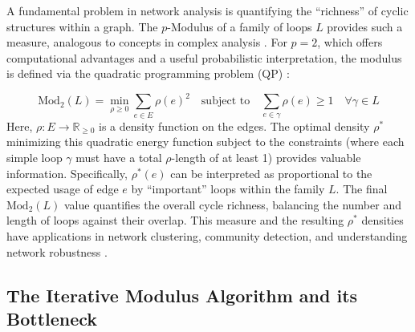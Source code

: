 \documentclass{article}
\begin{document}
\label{sec:loop_modulus_app}
A fundamental problem in network analysis is quantifying the ``richness'' of cyclic structures within a graph. The $p$-Modulus of a family of loops $L$ provides such a measure, analogous to concepts in complex analysis \cite{albin2016minimal}. For $p=2$, which offers computational advantages and a useful probabilistic interpretation, the modulus is defined via the quadratic programming problem (QP) \cite{shakeri2017network}:

\begin{equation}
\label{eq:modulus_primal}
\text{Mod}_2(L) = \min_{\rho \ge 0} \sum_{e \in E} \rho(e)^2 \quad \text{subject to} \quad \sum_{e \in \gamma} \rho(e) \ge 1 \quad \forall \gamma \in L
\end{equation}
Here, $\rho: E \to \mathbb{R}_{\ge 0}$ is a density function on the edges. The optimal density $\rho^*$ minimizing this quadratic energy function subject to the constraints (where each simple loop $\gamma$ must have a total $\rho$-length of at least 1) provides valuable information. Specifically, $\rho^*(e)$ can be interpreted as proportional to the expected usage of edge $e$ by ``important'' loops within the family $L$. The final $\text{Mod}_2(L)$ value quantifies the overall cycle richness, balancing the number and length of loops against their overlap. This measure and the resulting $\rho^*$ densities have applications in network clustering, community detection, and understanding network robustness \cite{shakeri2017network}.

\subsection{The Iterative Modulus Algorithm and its Bottleneck}
\label{subsec:modulus_algo_bottleneck}
\end{document}
